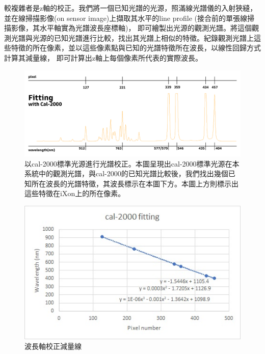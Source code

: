 \documentclass[12pt]{article}
\begin{document}
較複雜者是z軸的校正。我們將一個已知光譜的光源，照滿線光譜儀的入射狹縫，並在線掃描影像(on sensor image)上擷取其水平的line profile (接合前的單張線掃描影像，其水平軸實為光譜波長座標軸)，
即可繪製出光源的觀測光譜。將這個觀測光譜與光源的已知光譜進行比較，找出其光譜上相似的特徵。紀錄觀測光譜上這些特徵的所在像素，並以這些像素點與已知的光譜特徵所在波長，以線性回歸方式計算其減量線，
即可計算出z軸上每個像素所代表的實際波長。

\begin{figure}[h]
    \centering
    \includegraphics[width=\linewidth]{fitting.jpg}
    \caption[以cal-2000標準光源進行光譜校正]{以cal-2000標準光源進行光譜校正。本圖呈現出cal-2000標準光源在本系統中的觀測光譜，與cal-2000的已知光譜比較後，我們找出幾個已知所在波長的光譜特徵，其波長標示在本圖下方。本圖上方則標示出這些特徵在iXon上的所在像素。}
    \label{figure: fitting}
\end{figure}
\begin{figure}[h]
    \centering
    \includegraphics[width=\linewidth]{cal-2000fitting.jpg}
    \caption{波長軸校正減量線}
    \label{figure: fit curve}
\end{figure}
\end{document}
